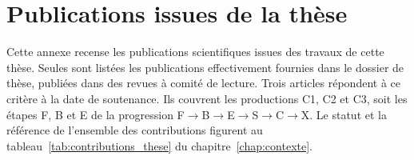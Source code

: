 \chapter{Publications issues de la th\`ese}
\label{chap:annexe_publications}
\begin{sloppypar}


Cette annexe recense les publications scientifiques issues des travaux de
cette th\`ese. Seules sont list\'ees les publications effectivement fournies
dans le dossier de th\`ese, publi\'ees dans des revues \`a comit\'e de lecture.
Trois articles r\'epondent \`a ce crit\`ere \`a la date de soutenance. Ils
couvrent les productions C1, C2 et C3, soit les \'etapes F, B et E de la
progression F$\to$B$\to$E$\to$S$\to$C$\to$X. Le statut et la r\'ef\'erence de
l'ensemble des contributions figurent au tableau~\ref{tab:contributions_these} du chapitre~\ref{chap:contexte}.
\end{sloppypar}



